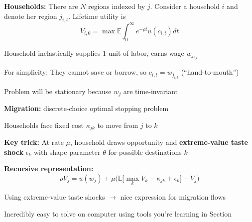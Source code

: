 \documentclass[11pt, aspectratio=169]{beamer}
\newenvironment{witemize}{\itemize\addtolength{\itemsep}{10pt}}{\enditemize}
\begin{document}
\begin{frame}{}

\textbf{Households:} 
There are $N$ regions indexed by $j$. Consider a household $i$ and denote her region $j_{i, t}$. Lifetime utility is 
\begin{equation*}
	V_{i, 0} = \max \mathbb E \int_0^\infty e^{- \rho t} u(c_{i, t}) dt
\end{equation*}

\begin{witemize}
\item Household inelastically supplies $1$ unit of labor, earns wage $w_{j_{i, t}}$

\item For simplicity: They cannot save or borrow, so $c_{i, t} = w_{j_{i, t}}$ (``hand-to-mouth'')

\item Problem will be stationary because $w_j$ are time-invariant
\end{witemize}
\end{frame}


\begin{frame}{}

\textbf{Migration:} discrete-choice optimal stopping problem
\vspace{4mm}
\begin{witemize}
\item Households face fixed cost $\kappa_{jk}$ to move from $j$ to $k$

\item \textbf{Key trick:} At rate $\mu$, household draws opportunity and \textbf{extreme-value taste shock} $\epsilon_k$ with shape parameter $\theta$ for possible destinations $k$
\end{witemize}

\vspace{5mm}
\textbf{Recursive representation:}
\begin{equation*}
	\rho V_j = u(w_j) 
	+ \mu \Big( \mathbb E \Big[ \max_k V_k - \kappa_{jk} + \epsilon_k \Big] - V_j \Big) 
\end{equation*}

\begin{witemize}
\item Using extreme-value taste shocks $\to$ nice expression for migration flows

\item Incredibly easy to solve on computer using tools you're learning in Section
\end{witemize}
\end{frame}
\end{document}
